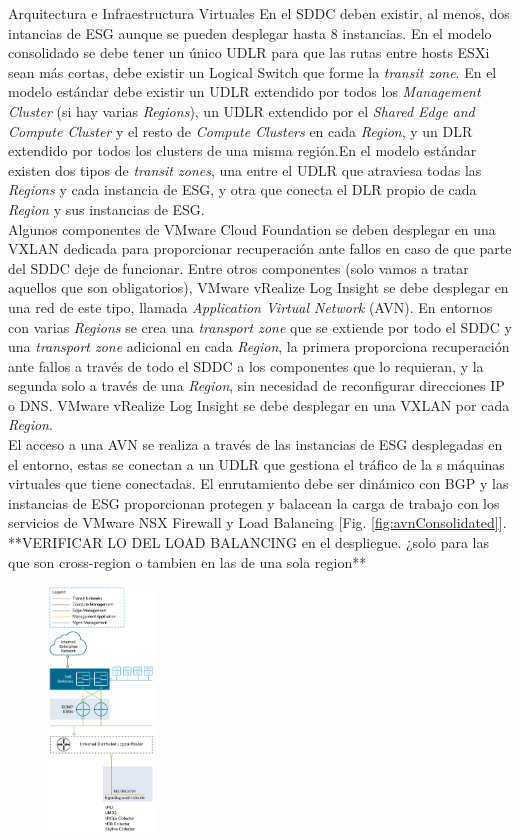 \begin{subsection}{Arquitectura e Infraestructura Virtuales\cite{CFVirtInfraes}}
 En el SDDC deben existir, al menos, dos intancias de ESG aunque se pueden desplegar hasta 8 instancias. En el modelo consolidado se debe tener un único UDLR para que las rutas entre hosts ESXi sean más cortas, debe existir un Logical Switch que forme la \textit{transit zone}. En el modelo estándar debe existir un UDLR extendido por todos los \textit{Management Cluster} (si hay varias \textit{Regions}), un UDLR extendido por el \textit{Shared Edge and Compute Cluster} y el resto de \textit{Compute Clusters} en cada \textit{Region}, y un DLR extendido por todos los clusters de una misma región.En el modelo estándar existen dos tipos de \textit{transit zones}, una entre el UDLR que atraviesa todas las \textit{Regions} y cada instancia de ESG, y otra que conecta el DLR propio de cada \textit{Region} y sus instancias de ESG. 
\\
Algunos componentes de VMware Cloud Foundation se deben desplegar en una VXLAN dedicada para proporcionar recuperación ante fallos en caso de que parte del SDDC deje de funcionar. Entre otros componentes (solo vamos a tratar aquellos que son obligatorios), VMware vRealize Log Insight se debe desplegar en una red de este tipo, llamada \textit{Application Virtual Network} (AVN). En entornos con varias \textit{Regions} se crea una \textit{transport zone} que se extiende por todo el SDDC y una \textit{transport zone} adicional en cada \textit{Region}, la primera proporciona recuperación ante fallos a través de todo el SDDC a los componentes que lo requieran, y la segunda solo a través de una \textit{Region}, sin necesidad de reconfigurar direcciones IP o DNS. VMware vRealize Log Insight se debe desplegar en una VXLAN por cada \textit{Region}.
\\
El acceso a una AVN se realiza a través de las instancias de ESG desplegadas en el entorno, estas se conectan a un UDLR que gestiona el tráfico de la s máquinas virtuales que tiene conectadas. El enrutamiento debe ser dinámico con BGP y las instancias de ESG proporcionan protegen y balacean la carga de trabajo con los servicios de VMware NSX Firewall y Load Balancing [Fig. \ref{fig:avnConsolidated}].\\
**VERIFICAR LO DEL LOAD BALANCING en el despliegue. ¿solo para las que son cross-region o tambien en las de una sola region**\\
\begin{figure}[h!]
  \centering
  \includegraphics[width=0.25\textwidth]{imaxes/conceptosPrevios/AVNConsolidated.png}

\end{figure}
\end{subsection}
